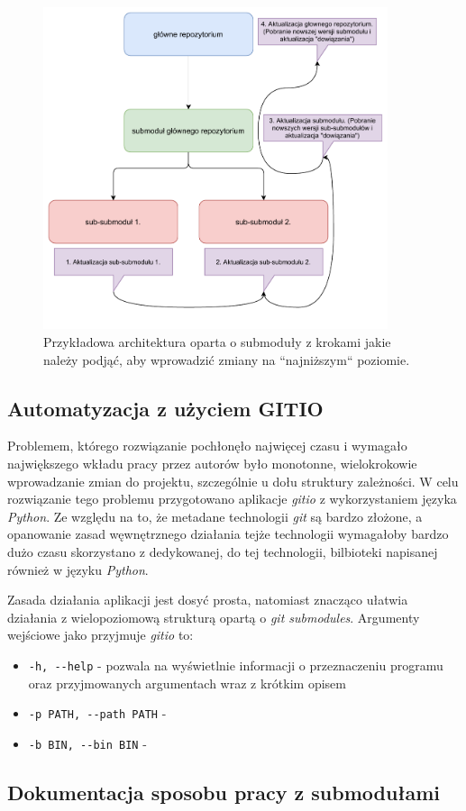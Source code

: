 \clearpage
\begin{figure}[H]
    \centering
    \includegraphics[width=0.9\textwidth]{components/infra/gitio_submodules_res/submodules_update}
    \caption{Przykładowa architektura oparta o submoduły z krokami jakie należy podjąć, aby wprowadzić zmiany na ``najniższym`` poziomie.}
    \label{fig:submodules_update}
\end{figure}


\subsection{Automatyzacja z użyciem GITIO}

Problemem, którego rozwiązanie pochłonęło najwięcej czasu i wymagało największego wkładu pracy przez autorów było monotonne, wielokrokowie wprowadzanie zmian do projektu, szczególnie u dołu struktury zależności. W celu rozwiązanie tego problemu przygotowano aplikacje \emph{gitio} z wykorzystaniem języka \emph{Python}. Ze względu na to, że metadane technologii \emph{git} są bardzo złożone, a opanowanie zasad węwnętrznego działania tejże technologii wymagałoby bardzo dużo czasu skorzystano z dedykowanej, do tej technologii, bilbioteki napisanej również w języku \emph{Python}.

Zasada działania aplikacji jest dosyć prosta, natomiast znacząco ułatwia działania z wielopoziomową strukturą opartą o \emph{git submodules}. Argumenty wejściowe jako przyjmuje \emph{gitio} to:
\begin{itemize}
    \item \lstinline{-h, --help} - pozwala na wyświetlnie informacji o przeznaczeniu programu oraz przyjmowanych argumentach wraz z krótkim opisem
    \item \lstinline{-p PATH, --path PATH} -
    \item \lstinline{-b BIN, --bin BIN} -
\end{itemize}

\subsection{Dokumentacja sposobu pracy z submodułami}

